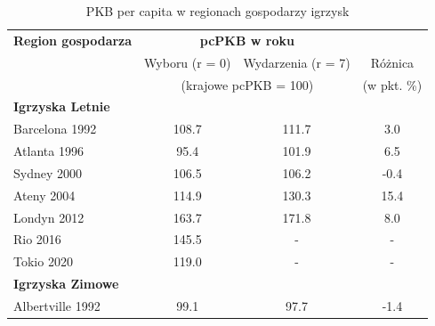 \documentclass[12pt]{article}
\begin{document}
    \begin{table}[ht]
        \caption{PKB per capita w regionach gospodarzy igrzysk}
        \centering
        \begin{tabular}{@{}lccc@{}}
            \toprule
            \textbf{Region gospodarza} & \multicolumn{2}{c}{\textbf{pcPKB w roku}}                                   & \multicolumn{1}{l}{\textbf{}} \\ 
                                       & \multicolumn{1}{l}{Wyboru (r = 0)} & \multicolumn{1}{l}{Wydarzenia (r = 7)} & Różnica                       \\
                                       & \multicolumn{2}{c}{(krajowe pcPKB = 100)}                                   & (w pkt. \%)                   \\ \midrule
            \textbf{Igrzyska Letnie}   & \multicolumn{1}{l}{}               & \multicolumn{1}{l}{}                   & \multicolumn{1}{l}{}          \\
            Barcelona 1992             & 108.7                              & 111.7                                  & 3.0                           \\
            Atlanta 1996               & 95.4                               & 101.9                                  & 6.5                           \\
            Sydney 2000                & 106.5                              & 106.2                                  & -0.4                          \\
            Ateny 2004                 & 114.9                              & 130.3                                  & 15.4                          \\
            Londyn 2012                & 163.7                              & 171.8                                  & 8.0                           \\
            Rio 2016                   & 145.5                              & -                                      & -                             \\
            Tokio 2020                 & 119.0                              & -                                      & -                             \\ 
            \textbf{Igrzyska Zimowe}   &                                    &                                        &                               \\
            Albertville 1992           & 99.1                               & 97.7                                   & -1.4                          \\

\end{tabular}
\end{table}
\end{document}
